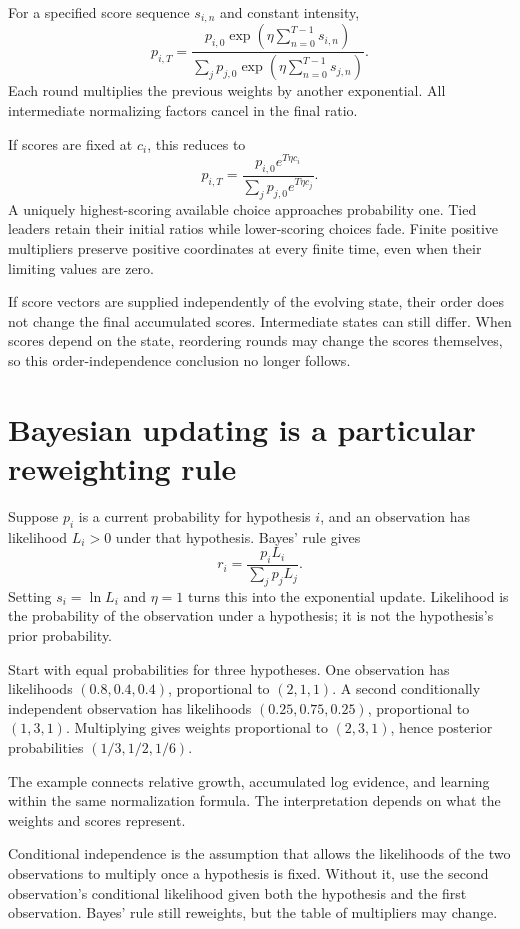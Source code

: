\documentclass[11pt,oneside,openany]{book}
\theoremstyle{definition}
\theoremstyle{remark}
\numberwithin{equation}{chapter}
\begin{document}
For a specified score sequence \(s_{i,n}\) and constant intensity, \[p_{i,T}=
\frac{p_{i,0}\exp\left(\eta\sum_{n=0}^{T-1}s_{i,n}\right)}
{\sum_jp_{j,0}\exp\left(\eta\sum_{n=0}^{T-1}s_{j,n}\right)}.\] Each round multiplies the previous weights by another exponential. All intermediate normalizing factors cancel in the final ratio.

If scores are fixed at \(c_i\), this reduces to \[p_{i,T}=\frac{p_{i,0}e^{T\eta c_i}}
{\sum_jp_{j,0}e^{T\eta c_j}}.\] A uniquely highest-scoring available choice approaches probability one. Tied leaders retain their initial ratios while lower-scoring choices fade. Finite positive multipliers preserve positive coordinates at every finite time, even when their limiting values are zero.

If score vectors are supplied independently of the evolving state, their order does not change the final accumulated scores. Intermediate states can still differ. When scores depend on the state, reordering rounds may change the scores themselves, so this order-independence conclusion no longer follows.

\section{Bayesian updating is a particular reweighting rule}\label{ch09-bayesian-updating-is-a-particular-reweighting-rule}

Suppose \(p_i\) is a current probability for hypothesis \(i\), and an observation has likelihood \(L_i>0\) under that hypothesis. Bayes' rule gives \[r_i=\frac{p_iL_i}{\sum_jp_jL_j}.\] Setting \(s_i=\ln L_i\) and \(\eta=1\) turns this into the exponential update. Likelihood is the probability of the observation under a hypothesis; it is not the hypothesis's prior probability.

Start with equal probabilities for three hypotheses. One observation has likelihoods \((0.8,0.4,0.4)\), proportional to \((2,1,1)\). A second conditionally independent observation has likelihoods \((0.25,0.75,0.25)\), proportional to \((1,3,1)\). Multiplying gives weights proportional to \((2,3,1)\), hence posterior probabilities \((1/3,1/2,1/6)\).

The example connects relative growth, accumulated log evidence, and learning within the same normalization formula. The interpretation depends on what the weights and scores represent.

Conditional independence is the assumption that allows the likelihoods of the two observations to multiply once a hypothesis is fixed. Without it, use the second observation's conditional likelihood given both the hypothesis and the first observation. Bayes' rule still reweights, but the table of multipliers may change.
\end{document}
